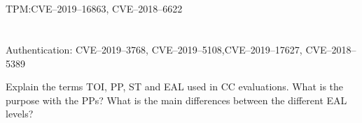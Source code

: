 \begin{questions}
\begin{parts}
  \part{} TPM:\@ CVE--2019--16863, CVE--2018--6622
  \part{} Authentication: CVE--2019--3768, CVE--2019--5108,CVE--2019--17627, CVE--2018--5389
  \end{parts}

\question{} Explain the terms TOI, PP, ST and EAL used in CC evaluations.
\question{} What is the purpose with the PPs?
\question{} What is the main differences between the different EAL levels?
\end{questions}

